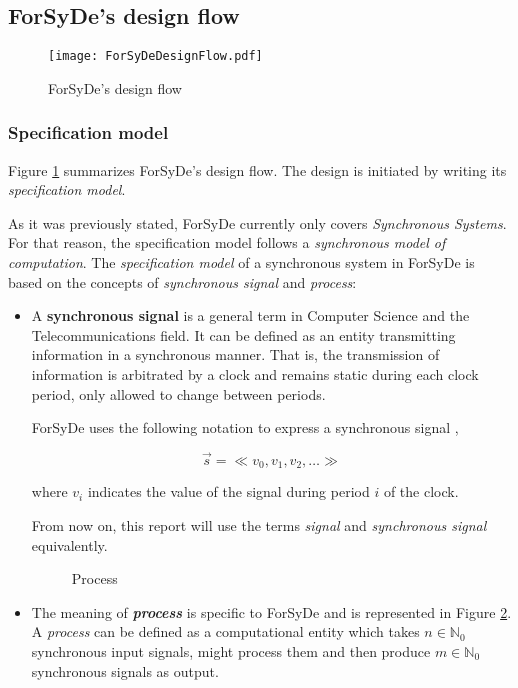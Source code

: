\subsection{ForSyDe's design flow}
\begin{figure}
\centering
\texttt{[image: ForSyDeDesignFlow.pdf]}
  \caption{ForSyDe's design flow}
  \label{fig:flow}
\end{figure}
\subsubsection{Specification model}
Figure \ref{fig:flow} summarizes ForSyDe's design flow. The design is
initiated by writing its \textit{specification model}.

As it was previously stated, ForSyDe currently only covers
\textit{Synchronous Systems}. For that reason, the specification model
follows a \textit{synchronous model of computation}. The
\textit{specification model} of a synchronous system in ForSyDe is
based on the concepts of \textit{synchronous signal} and
\textit{process}:

\begin{itemize}
\item A \textbf{synchronous signal} is a general term in Computer
  Science and the Telecommunications field. It can be defined as an
  entity transmitting information in a synchronous manner. That is, the
  transmission of information is arbitrated by a clock and remains
  static during each clock period, only allowed to change between
  periods. 
  
  ForSyDe uses the following notation to express a synchronous signal
  ,

  $$\overrightarrow{s} = \ll v_0,v_1,v_2,\dots \gg$$

  where $v_i$ indicates the value of the signal during period $i$ of
  the clock.
  
  From now on, this report will use the terms \textit{signal} and
  \textit{synchronous signal} equivalently.
  
\begin{figure}
\centering

  \caption{Process}
  \label{fig:proc}
\end{figure}

\item The meaning of \textit{\textbf{process}} is specific to ForSyDe
  and is represented in Figure \ref{fig:proc}.  A \textit{process} can
  be defined as a computational entity which takes $n \in
  \mathbb{N}_0$ synchronous input signals, might process them and then
  produce $m \in \mathbb{N}_0$ synchronous signals as output.
\end{itemize}
  
